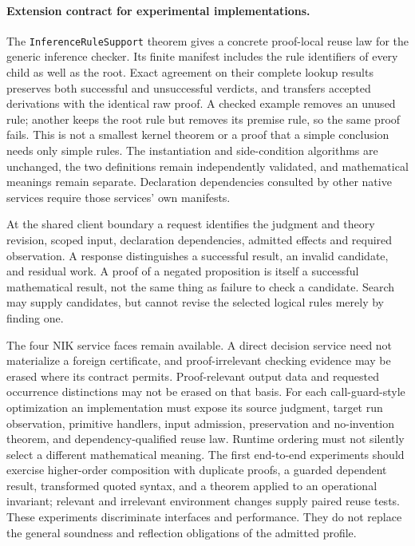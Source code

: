 \documentclass[11pt]{article}
\theoremstyle{definition}
\theoremstyle{remark}
\begin{document}
\paragraph{Extension contract for experimental implementations.}
The \nolinkurl{InferenceRuleSupport} theorem gives a concrete proof-local
reuse law for the generic inference checker. Its finite manifest includes
the rule identifiers of every child as well as the root. Exact agreement
on their complete lookup results preserves both successful and unsuccessful
verdicts, and transfers accepted derivations with the identical raw proof.
A checked example removes an unused rule; another keeps the root rule but
removes its premise rule, so the same proof fails. This is not a smallest
kernel theorem or a proof that a simple conclusion needs only simple rules.
The instantiation and side-condition algorithms are unchanged, the two
definitions remain independently validated, and mathematical meanings remain
separate. Declaration dependencies consulted by other native services require
those services' own manifests.

At the shared client boundary a request identifies the judgment and theory
revision, scoped input, declaration dependencies, admitted effects and
required observation. A response distinguishes a successful result, an
invalid candidate, and residual work. A proof of a negated proposition is
itself a successful mathematical result, not the same thing as failure to
check a candidate. Search may supply candidates, but cannot revise the
selected logical rules merely by finding one.

The four NIK service faces remain available. A direct decision service need
not materialize a foreign certificate, and proof-irrelevant checking evidence
may be erased where its contract permits. Proof-relevant output data and
requested occurrence distinctions may not be erased on that basis. For each
call-guard-style optimization an implementation must expose its source
judgment, target run observation, primitive handlers, input admission,
preservation and no-invention theorem, and dependency-qualified reuse law.
Runtime ordering must not silently select a different mathematical meaning.
The first end-to-end experiments should exercise higher-order composition
with duplicate proofs, a guarded dependent result, transformed quoted syntax,
and a theorem applied to an operational invariant; relevant and irrelevant
environment changes supply paired reuse tests. These experiments discriminate
interfaces and performance. They do not replace the general soundness and
reflection obligations of the admitted profile.
\end{document}

